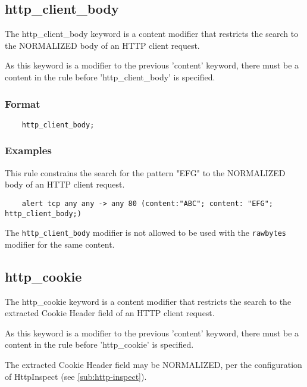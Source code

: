 \documentclass[english]{report}
\newenvironment{note}{
\samepage
    \vspace{10pt}{\textsf{
        {\hspace{7pt}\Huge{$\triangle$\hspace{-12.5pt}{\Large{$^!$}}}}\hspace{5pt}
        {\Large{NOTE}}
    }
    }
   \begin{center}
    \par\vspace{-17pt}

    \begin{lrbox}{\savepar}
    \begin{minipage}[r]{6in}
}
{
    \end{minipage}
    \end{lrbox}
    \fbox{
        \usebox{
            \savepar
	}
    }
    \par\vskip10pt
    \end{center}
}
\newenvironment{note}{
        \begin{rawhtml}
        <p><table border="1"><tr><td><b>
        Note:&nbsp;&nbsp;</b>
        \end{rawhtml}
}{
        \begin{rawhtml}
        </b></td></tr></table></p>
        \end{rawhtml}
}
\begin{document}
\subsection{http\_client\_body}
\label{sub:HttpClientBody}

The http\_client\_body keyword is a content modifier that restricts the search
to the NORMALIZED body of an HTTP client request.

As this keyword is a modifier to the previous 'content' keyword, there must be
a content in the rule before 'http\_client\_body' is specified.

\subsubsection{Format}

\begin{verbatim}
    http_client_body;
\end{verbatim}

\subsubsection{Examples}

This rule constrains the search for the pattern "EFG" to the NORMALIZED body of
an HTTP client request.

\begin{verbatim}
    alert tcp any any -> any 80 (content:"ABC"; content: "EFG"; http_client_body;)
\end{verbatim}

\begin{note}
The \texttt{http\_client\_body} modifier is not allowed to be used with
the \texttt{rawbytes} modifier for the same content.
\end{note}

\subsection{http\_cookie}
\label{sub:HttpCookie}

The http\_cookie keyword is a content modifier that restricts the search to the
extracted Cookie Header field of an HTTP client request.

As this keyword is a modifier to the previous 'content' keyword, there must be
a content in the rule before 'http\_cookie' is specified.

The extracted Cookie Header field may be NORMALIZED, per the configuration of
HttpInspect (see \ref{sub:http-inspect}).
\end{document}
